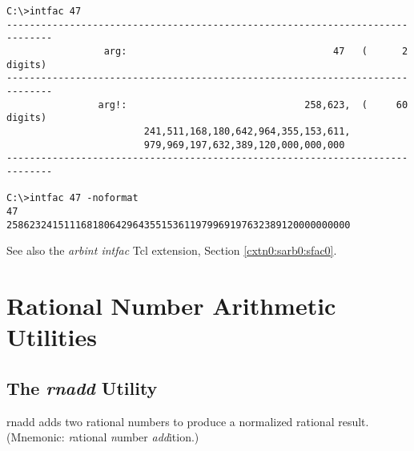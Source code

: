 \begin{dosutilcommandsampleinvocations}
\begin{scriptsize}
\begin{verbatim}
C:\>intfac 47
------------------------------------------------------------------------------
                 arg:                                    47   (      2 digits)
------------------------------------------------------------------------------
                arg!:                               258,623,  (     60 digits)
                        241,511,168,180,642,964,355,153,611,
                        979,969,197,632,389,120,000,000,000
------------------------------------------------------------------------------

C:\>intfac 47 -noformat
47
258623241511168180642964355153611979969197632389120000000000
\end{verbatim}
\end{scriptsize}
\end{dosutilcommandsampleinvocations}

\begin{dosutilcommandseealso}
See also the \emph{arbint intfac} Tcl extension, 
Section \ref{cxtn0:sarb0:sfac0}.
\end{dosutilcommandseealso}


\section{Rational Number Arithmetic Utilities}
\label{cdcm0:srnu0}


\subsection{The \emph{rnadd} Utility}
\label{cdcm0:srnu0:srna0}

\begin{dosutilcommandname}{rnadd}%
adds two rational numbers to produce a normalized rational result.  
(Mnemonic:  \emph{r}ational \emph{n}umber
\emph{add}ition.)
\end{dosutilcommandname}

